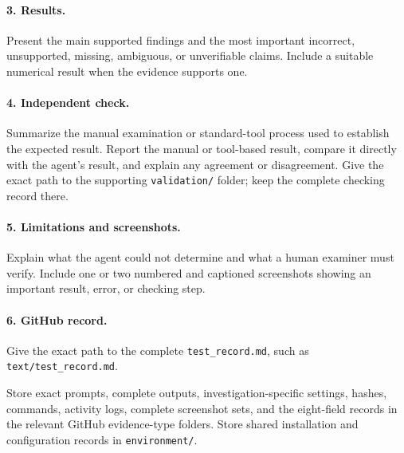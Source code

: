 \documentclass[12pt,letterpaper]{article}
\begin{document}
\paragraph{3. Results.} Present the main supported findings and the most important incorrect, unsupported, missing, ambiguous, or unverifiable claims. Include a suitable numerical result when the evidence supports one.
\paragraph{4. Independent check.} Summarize the manual examination or standard-tool process used to establish the expected result. Report the manual or tool-based result, compare it directly with the agent's result, and explain any agreement or disagreement. Give the exact path to the supporting \texttt{validation/} folder; keep the complete checking record there.
\paragraph{5. Limitations and screenshots.} Explain what the agent could not determine and what a human examiner must verify. Include one or two numbered and captioned screenshots showing an important result, error, or checking step.
\paragraph{6. GitHub record.} Give the exact path to the complete \texttt{test\_record.md}, such as \texttt{text/test\_record.md}.

Store exact prompts, complete outputs, investigation-specific settings, hashes, commands, activity logs, complete screenshot sets, and the eight-field records in the relevant GitHub evidence-type folders. Store shared installation and configuration records in \texttt{environment/}.
\end{document}
